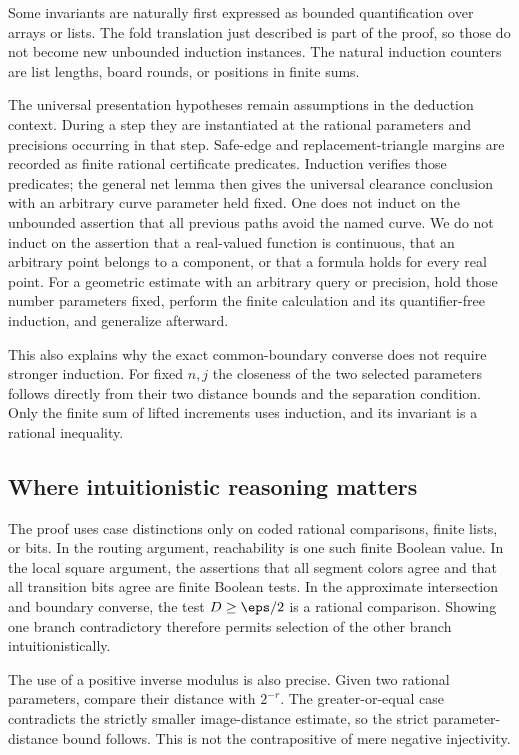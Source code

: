Some invariants are naturally first expressed as bounded
quantification over arrays or lists. The fold translation just
described is part of the proof, so those do not become new
unbounded induction instances. The natural induction counters
are list lengths, board rounds, or positions in finite sums.

The universal presentation hypotheses remain assumptions in
the deduction context. During a step they are instantiated at
the rational parameters and precisions occurring in that step.
Safe-edge and replacement-triangle margins are recorded as finite
rational certificate predicates. Induction verifies those
predicates; the general net lemma then gives the universal
clearance conclusion with an arbitrary curve parameter held fixed.
One does not induct on the unbounded assertion that all
previous paths avoid the named curve.
We do not induct on the assertion that a real-valued function
is continuous, that an arbitrary point belongs to a component,
or that a formula holds for every real point. For a geometric
estimate with an arbitrary query or precision, hold those
number parameters fixed, perform the finite calculation and
its quantifier-free induction, and generalize afterward.

This also explains why the exact common-boundary converse does
not require stronger induction. For fixed $n,j$ the closeness
of the two selected parameters follows directly from their
two distance bounds and the separation condition. Only the
finite sum of lifted increments uses induction, and its
invariant is a rational inequality.

\subsection{Where intuitionistic reasoning matters}

The proof uses case distinctions only on coded rational
comparisons, finite lists, or bits. In the routing argument,
reachability is one such finite Boolean value. In the local
square argument, the assertions that all segment colors agree
and that all transition bits agree are finite Boolean tests.
In the approximate intersection and boundary converse,
the test $D\ge\eps/2$ is a rational comparison.
Showing one branch contradictory therefore permits selection
of the other branch intuitionistically.

The use of a positive inverse modulus is also precise.
Given two rational parameters, compare their distance with
$2^{-r}$. The greater-or-equal case contradicts the
strictly smaller image-distance estimate, so the strict
parameter-distance bound follows. This is not the
contrapositive of mere negative injectivity.

